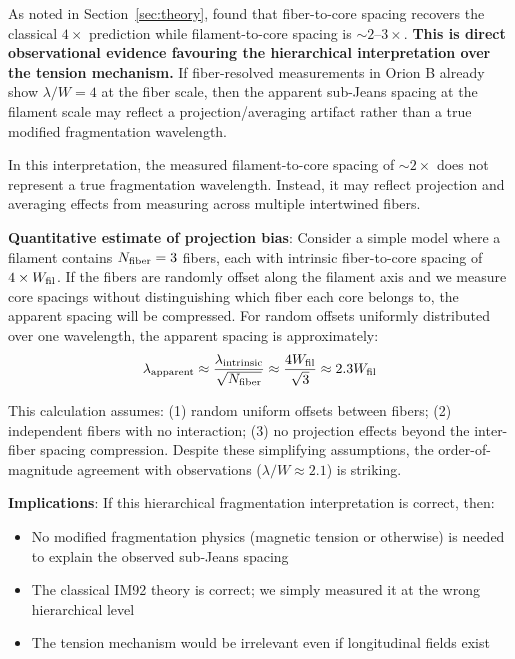 \documentclass[11pt,a4paper]{article}
\begin{document}
As noted in Section~\ref{sec:theory}, \citet{Yang2024} found that fiber-to-core spacing recovers the classical $4\times$ prediction while filament-to-core spacing is $\sim2$--$3\times$. \textbf{This is direct observational evidence favouring the hierarchical interpretation over the tension mechanism.} If fiber-resolved measurements in Orion B already show $\lambda/W = 4$ at the fiber scale, then the apparent sub-Jeans spacing at the filament scale may reflect a projection/averaging artifact rather than a true modified fragmentation wavelength.

In this interpretation, the measured filament-to-core spacing of $\sim2\times$ does not represent a true fragmentation wavelength. Instead, it may reflect projection and averaging effects from measuring across multiple intertwined fibers.

\textbf{Quantitative estimate of projection bias}: Consider a simple model where a filament contains $N_{\rm fiber} = 3$ fibers, each with intrinsic fiber-to-core spacing of $4\times W_{\rm fil}$. If the fibers are randomly offset along the filament axis and we measure core spacings without distinguishing which fiber each core belongs to, the apparent spacing will be compressed. For random offsets uniformly distributed over one wavelength, the apparent spacing is approximately:
\begin{equation}
\lambda_{\rm apparent} \approx \frac{\lambda_{\rm intrinsic}}{\sqrt{N_{\rm fiber}}} \approx \frac{4 W_{\rm fil}}{\sqrt{3}} \approx 2.3 W_{\rm fil}
\label{eq:projection_bias}
\end{equation}

This calculation assumes: (1) random uniform offsets between fibers; (2) independent fibers with no interaction; (3) no projection effects beyond the inter-fiber spacing compression. Despite these simplifying assumptions, the order-of-magnitude agreement with observations ($\lambda/W \approx 2.1$) is striking.

\textbf{Implications}: If this hierarchical fragmentation interpretation is correct, then:
\begin{itemize}
    \item No modified fragmentation physics (magnetic tension or otherwise) is needed to explain the observed sub-Jeans spacing
    \item The classical IM92 theory is correct; we simply measured it at the wrong hierarchical level
    \item The tension mechanism would be irrelevant even if longitudinal fields exist
\end{itemize}
\end{document}
